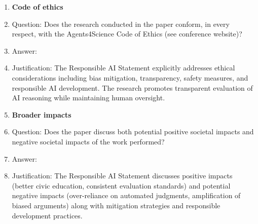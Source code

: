 \documentclass[11pt]{article}
\begin{document}
\begin{enumerate}
\item {\bf Code of ethics}
    \item[] Question: Does the research conducted in the paper conform, in every respect, with the Agents4Science Code of Ethics (see conference website)?
    \item[] Answer: \answerYes{} 
    \item[] Justification: The Responsible AI Statement explicitly addresses ethical considerations including bias mitigation, transparency, safety measures, and responsible AI development. The research promotes transparent evaluation of AI reasoning while maintaining human oversight.
    
\item {\bf Broader impacts}
    \item[] Question: Does the paper discuss both potential positive societal impacts and negative societal impacts of the work performed?
    \item[] Answer: \answerYes{} 
    \item[] Justification: The Responsible AI Statement discusses positive impacts (better civic education, consistent evaluation standards) and potential negative impacts (over-reliance on automated judgments, amplification of biased arguments) along with mitigation strategies and responsible development practices.

\end{enumerate}
\end{document}
